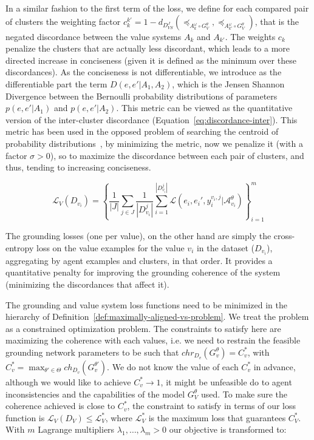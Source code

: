 \documentclass{ecai}
\newcommand{\A}{\mathcal{A}}
\newcommand{\abs}[1]{{\left|#1\right|}}
\begin{document}
In a similar fashion to the first term of the loss, we define for each compared pair of clusters the weighting factor $c_k^{k'} = 1-d_{D_{VS}^{J}}(\preccurlyeq_{A_k^\omega \circ G_V^\theta},\preccurlyeq_{A_{k'}^\omega\circ G_V^\theta})$, that is the negated discordance between the value systems $A_k$ and $A_{k'}$. The weights $c_k$ penalize the clusters that are actually less discordant, which leads to a more directed increase in conciseness (given it is defined as the minimum over these discordances). As the conciseness is not differentiable, we introduce as the differentiable part the term $D(e,e'|A_1,A_2)$, which is the Jensen Shannon Divergence between the Bernoulli probability distributions of parameters $p(e,e'|A_1)$ and $p(e,e'|A_2)$. This metric can be viewed as the quantitative version of the inter-cluster discordance (Equation~\ref{eq:discordance-inter}). This metric has been used in the opposed problem of searching the centroid of probability distributions~\cite{jensenfordistancebetweenprobscentroid}, by minimizing the metric, now we penalize it (with a factor $\sigma>0$), so to maximize the discordance between each pair of clusters, and thus, tending to increasing conciseness. 

\begin{equation}\label{eq:loss_gr}
    \mathcal{L}_{V}(D_{v_i}) = \left\{\frac{1}{\abs{J}}\sum_{j\in J}\frac{1}{\abs{D^j_{v_i}}}\sum_{i=1}^\abs{D_{v_i}^j} \mathcal{L}(e_i,e_i',y_i^{v_i,j}|\A_{v_i}^\theta)\right\}_{i=1}^m
\end{equation}

The grounding losses (one per value), on the other hand are simply the cross-entropy loss on the value examples for the value $v_i$ in the dataset ($D_{v_i}$), aggregating by agent examples and clusters, in that order. It provides a quantitative penalty for improving the grounding coherence of the system (minimizing the discordances that affect it).  

The grounding and value system loss functions need to be minimized in the hierarchy of Definition~\ref{def:maximally-aligned-vs-problem}. We treat the problem as a constrained optimization problem. The constraints to satisfy here are maximizing the coherence with each values, i.e. we need to restrain the feasible grounding network parameters to be such that $ chr_{D_v}(G^{\theta}_{v}) = C^*_v$, with $C^*_v = \max_{\theta' \in \Theta}ch_{D_v}(G^{\theta'}_v)$. We do not know the value of each $C^*_v$ in advance, although we would like to achieve $C^*_v \to 1$, it might be unfeasible do to agent inconsistencies and the capabilities of the model $G_V^\theta$ used. To make sure the coherence achieved is close to $C^*_v$, the constraint to satisfy in terms of our loss function is $\mathcal{L}_V(D_V) \leq \mathcal{L}^*_V$, where $\mathcal{L}^*_V$ is the maximum loss that guarantees $C^*_V$. With $m$ Lagrange multipliers $\lambda_1, \dots, \lambda_m > 0$ our objective is transformed to:
\end{document}
